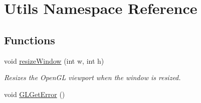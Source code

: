\hypertarget{namespaceUtils}{}\section{Utils Namespace Reference}
\label{namespaceUtils}
\subsection*{Functions}
\begin{DoxyCompactItemize}
\item 
void \hyperlink{namespaceUtils_acc1e31ef959e7b254cb43b47be238af6}{resize\+Window} (int w, int h)
\begin{DoxyCompactList}\small\item\em Resizes the Open\+G\+L viewport when the window is resized. \end{DoxyCompactList}\item 
\hypertarget{namespaceUtils_a8f7c7c4fbf51f5d7aa6ee6fc6dd249b9}{}void \hyperlink{namespaceUtils_a8f7c7c4fbf51f5d7aa6ee6fc6dd249b9}{G\+L\+Get\+Error} ()\label{namespaceUtils_a8f7c7c4fbf51f5d7aa6ee6fc6dd249b9}


\end{DoxyCompactItemize}
